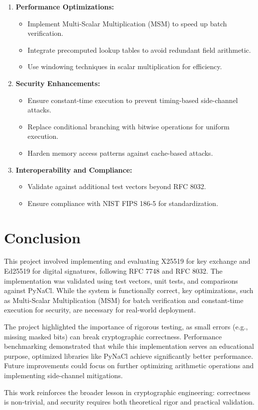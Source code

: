\documentclass[twoside,a4paper,12pt]{article}
\begin{document}
\begin{enumerate}
    \item \textbf{Performance Optimizations:}
    \begin{itemize}
        \item Implement {Multi-Scalar Multiplication (MSM)} to speed up batch verification.
        \item Integrate {precomputed lookup tables} to avoid redundant field arithmetic.
        \item Use {windowing techniques} in scalar multiplication for efficiency.
    \end{itemize}
      
    \item \textbf{Security Enhancements:}
    \begin{itemize}
        \item Ensure {constant-time execution} to prevent timing-based side-channel attacks.
        \item Replace conditional branching with {bitwise operations} for uniform execution.
        \item Harden memory access patterns against {cache-based attacks}.
    \end{itemize}

    \item \textbf{Interoperability and Compliance:}
    \begin{itemize}
        \item Validate against additional {test vectors} beyond RFC 8032.
        \item Ensure compliance with {NIST FIPS 186-5} for standardization.
    \end{itemize}
\end{enumerate}

\section{Conclusion}
This project involved implementing and evaluating X25519 for key exchange and Ed25519 for digital signatures, following RFC 7748 and RFC 8032. The implementation was validated using test vectors, unit tests, and comparisons against PyNaCl. While the system is functionally correct, key optimizations, such as Multi-Scalar Multiplication (MSM) for batch verification and constant-time execution for security, are necessary for real-world deployment. 

The project highlighted the importance of rigorous testing, as small errors (e.g., missing masked bits) can break cryptographic correctness. Performance benchmarking demonstrated that while this implementation serves an educational purpose, optimized libraries like PyNaCl achieve significantly better performance. Future improvements could focus on further optimizing arithmetic operations and implementing side-channel mitigations.

This work reinforces the broader lesson in cryptographic engineering: correctness is non-trivial, and security requires both theoretical rigor and practical validation.

\newpage
\printbibliography
\end{document}
